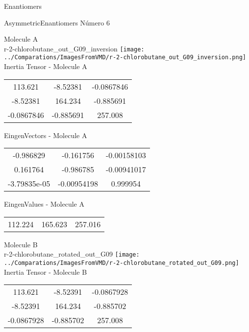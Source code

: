 \begin{center}
\vtab
\vtab
\textcolor{NavyBlue}{\Large Enantiomers}
\end{center}

 \newpage

\vtab[-2cm]
\begin{center}
{\large AsymmetricEnantiomers \tab Número 6}
\end{center}
\begin{multicols}{2}
\begin{center}

Molecule A \\ 
r-2-chlorobutane\_out\_G09\_inversion
\texttt{[image: ../Comparations/ImagesFromVMD/r-2-chlorobutane\_out\_G09\_inversion.png]}
\\
Inertia Tensor - Molecule A \\
\vtab

\begin{tabular}{|c c c|}
113.621	 & 	-8.52381	 & 	-0.0867846	 \\
-8.52381	 & 	164.234	 & 	-0.885691	 \\
-0.0867846	 & 	-0.885691	 & 	257.008
\end{tabular}

\vtab
 EingenVectors - Molecule A     \\
\vtab
\begin{tabular}{|c c c|}
-0.986829	 & 	-0.161756	 & 	-0.00158103	 \\
0.161764	 & 	-0.986785	 & 	-0.00941017	 \\
-3.79835e-05	 & 	-0.00954198	 & 	0.999954
\end{tabular}

\vtab
 EingenValues - Molecule A     \\
\vtab
\begin{tabular}{|c c c|}
112.224	 & 	165.623	 & 	257.016	 \\
\end{tabular}
\columnbreak

Molecule B \\ 
r-2-chlorobutane\_rotated\_out\_G09
\texttt{[image: ../Comparations/ImagesFromVMD/r-2-chlorobutane\_rotated\_out\_G09.png]}
\\
Inertia Tensor - Molecule B \\
\vtab

\begin{tabular}{|c c c|}
113.621	 & 	-8.52391	 & 	-0.0867928	 \\
-8.52391	 & 	164.234	 & 	-0.885702	 \\
-0.0867928	 & 	-0.885702	 & 	257.008
\end{tabular}


\end{center}
\end{multicols}
